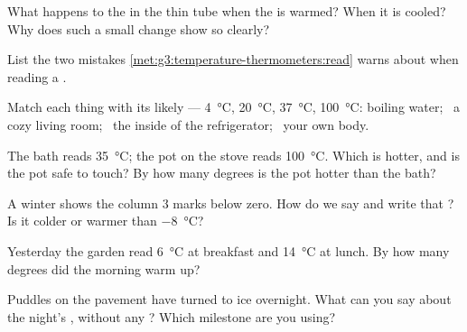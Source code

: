 \begin{exercise}[$\star$]\label{exo:g3:temperature-thermometers:3}
What happens to the  in the thin tube when the  is
warmed? When it is cooled? Why does such a small change show so
clearly?
\end{exercise}

\begin{exercise}[$\star$]\label{exo:g3:temperature-thermometers:4}
List the two mistakes \cref{met:g3:temperature-thermometers:read}
warns about when reading a .
\end{exercise}

\begin{exercise}[$\star$]\label{exo:g3:temperature-thermometers:5}
Match each thing with its likely  ---
\qty{4}{\celsius}, \qty{20}{\celsius}, \qty{37}{\celsius},
\qty{100}{\celsius}: boiling water; \ a cozy living room; \ the
inside of the refrigerator; \ your own body.
\end{exercise}

\begin{exercise}[$\star$]\label{exo:g3:temperature-thermometers:6}
The bath  reads \qty{35}{\celsius}; the pot on the stove
reads \qty{100}{\celsius}. Which is hotter, and is the pot safe to
touch? By how many degrees is the pot hotter than the bath?
\end{exercise}

\begin{exercise}[$\star$]\label{exo:g3:temperature-thermometers:7}
A winter  shows the column $3$ marks below zero. How do
we say and write that ? Is it colder or warmer than
\qty{-8}{\celsius}?
\end{exercise}

\begin{exercise}[$\star$]\label{exo:g3:temperature-thermometers:8}
Yesterday the garden  read \qty{6}{\celsius} at breakfast
and \qty{14}{\celsius} at lunch. By how many degrees did the morning
warm up?
\end{exercise}

\begin{exercise}[$\star$]\label{exo:g3:temperature-thermometers:9}
Puddles on the pavement have turned to ice overnight. What can you
say about the night's , without any ? Which
milestone are you using?
\end{exercise}

